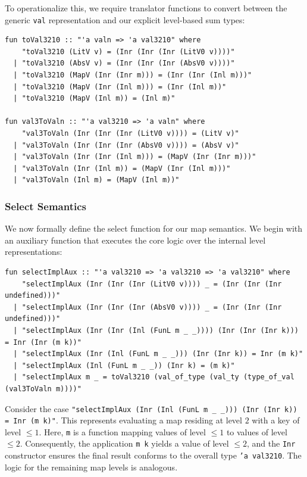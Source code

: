 \documentclass[11pt]{article}
\begin{document}
To operationalize this, we require translator functions to convert between the generic \texttt{val} representation and our explicit level-based sum types:

\begin{verbatim}
fun toVal3210 :: "'a valn => 'a val3210" where
    "toVal3210 (LitV v) = (Inr (Inr (Inr (LitV0 v))))"
  | "toVal3210 (AbsV v) = (Inr (Inr (Inr (AbsV0 v))))"
  | "toVal3210 (MapV (Inr (Inr m))) = (Inr (Inr (Inl m)))"
  | "toVal3210 (MapV (Inr (Inl m))) = (Inr (Inl m))"
  | "toVal3210 (MapV (Inl m)) = (Inl m)"

fun val3ToValn :: "'a val3210 => 'a valn" where
    "val3ToValn (Inr (Inr (Inr (LitV0 v)))) = (LitV v)"
  | "val3ToValn (Inr (Inr (Inr (AbsV0 v)))) = (AbsV v)"
  | "val3ToValn (Inr (Inr (Inl m))) = (MapV (Inr (Inr m)))"
  | "val3ToValn (Inr (Inl m)) = (MapV (Inr (Inl m)))"
  | "val3ToValn (Inl m) = (MapV (Inl m))"
\end{verbatim}

\subsubsection{Select Semantics}
\label{sec:select}

We now formally define the select function for our map semantics. We begin with an auxiliary function that executes the core logic over the internal level representations:

\begin{verbatim}
fun selectImplAux :: "'a val3210 => 'a val3210 => 'a val3210" where
    "selectImplAux (Inr (Inr (Inr (LitV0 v)))) _ = (Inr (Inr (Inr undefined)))"
  | "selectImplAux (Inr (Inr (Inr (AbsV0 v)))) _ = (Inr (Inr (Inr undefined)))"
  | "selectImplAux (Inr (Inr (Inl (FunL m _ _)))) (Inr (Inr (Inr k))) = Inr (Inr (m k))"
  | "selectImplAux (Inr (Inl (FunL m _ _))) (Inr (Inr k)) = Inr (m k)"
  | "selectImplAux (Inl (FunL m _ _)) (Inr k) = (m k)"
  | "selectImplAux m _ = toVal3210 (val_of_type (val_ty (type_of_val (val3ToValn m))))"
\end{verbatim}


Consider the case \texttt{"selectImplAux (Inr (Inl (FunL m \_ \_))) (Inr (Inr k)) = Inr (m k)"}.
This represents evaluating a map residing at level $2$ with a key of level $\le 1$.
Here, \texttt{m} is a function mapping values of level $\le 1$ to values of level $\le 2$.
Consequently, the application \texttt{m k} yields a value of level $\le 2$, and the \texttt{Inr} constructor ensures the final result conforms to the overall type \texttt{'a val3210}.
The logic for the remaining map levels is analogous.
\end{document}
